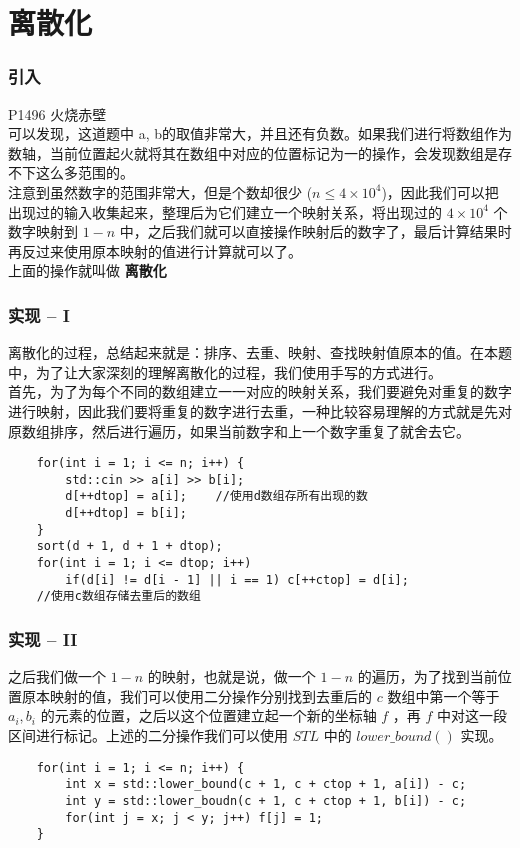 \documentclass{beamer}
\newcommand{\fdf}[1]{\alert{\textbf{#1}}}
\begin{document}
\section{离散化}
\begin{frame}
\frametitle{引入}
P1496 火烧赤壁 \\ 
可以发现，这道题中 a, b的取值非常大，并且还有负数。如果我们进行将数组作为数轴，当前位置起火就将其在数组中对应的位置标记为一的操作，会发现数组是存不下这么多范围的。 \\
注意到虽然数字的范围非常大，但是个数却很少 ($n \leq 4 \times 10^4$)，因此我们可以把出现过的输入收集起来，整理后为它们建立一个映射关系，将出现过的	 $4 \times 10^4$ 个数字映射到 $1 - n$ 中，之后我们就可以直接操作映射后的数字了，最后计算结果时再反过来使用原本映射的值进行计算就可以了。\\
上面的操作就叫做 \fdf{离散化}
\end{frame}
\begin{frame}[fragile]
\frametitle{实现 -- I}
离散化的过程，总结起来就是：排序、去重、映射、查找映射值原本的值。在本题中，为了让大家深刻的理解离散化的过程，我们使用手写的方式进行。	\\ 
首先，为了为每个不同的数组建立一一对应的映射关系，我们要避免对重复的数字进行映射，因此我们要将重复的数字进行去重，一种比较容易理解的方式就是先对原数组排序，然后进行遍历，如果当前数字和上一个数字重复了就舍去它。
\begin{onlyenv}
\begin{verbatim}
    for(int i = 1; i <= n; i++) {
        std::cin >> a[i] >> b[i];
        d[++dtop] = a[i];    //使用d数组存所有出现的数
        d[++dtop] = b[i];
    }
    sort(d + 1, d + 1 + dtop);
    for(int i = 1; i <= dtop; i++) 
        if(d[i] != d[i - 1] || i == 1) c[++ctop] = d[i];
    //使用c数组存储去重后的数组
\end{verbatim}
\end{onlyenv}
\end{frame}
\begin{frame}[fragile]
\frametitle{实现 -- II}
之后我们做一个 $1 - n$ 的映射，也就是说，做一个 $1 - n$ 的遍历，为了找到当前位置原本映射的值，我们可以使用二分操作分别找到去重后的 $c$ 数组中第一个等于 $a_i, b_i$ 的元素的位置，之后以这个位置建立起一个新的坐标轴 $f$ ，再 $f$ 中对这一段区间进行标记。上述的二分操作我们可以使用 $STL$ 中的 $lower\_bound()$ 实现。
\begin{onlyenv}
\begin{verbatim}
    for(int i = 1; i <= n; i++) {
        int x = std::lower_bound(c + 1, c + ctop + 1, a[i]) - c;
        int y = std::lower_boudn(c + 1, c + ctop + 1, b[i]) - c;
        for(int j = x; j < y; j++) f[j] = 1;
    }
\end{verbatim}
\end{onlyenv}
\end{frame}
\end{document}
